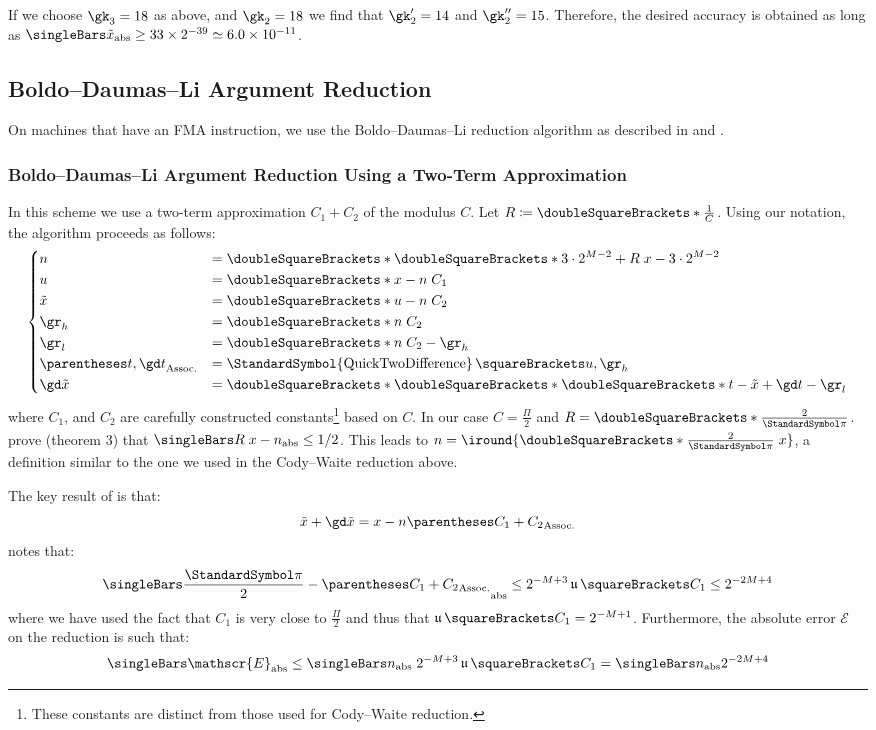 \documentclass[10pt, a4paper, twoside]{basestyle}
\DeclareMathOperator{\ULP}{\mathfrak u}
\DeclareMathOperator{\quicktwodifference}{\StandardSymbol{QuickTwoDifference}}
\newcommand{\round}[1]{\doubleSquareBrackets*{#1}}
\newcommand{\red}[1]{\tilde{#1}}
\begin{document}
If we choose $\gk_3 = 18$ as above, and $\gk_2 = 18$ we find that $\gk'_2 = 14$ and $\gk''_2 = 15$.  Therefore, the desired accuracy is obtained as long as $\abs{\red x} \geq 33 \times 2^{-39} \simeq 6.0 \times 10^{-11}$.

\subsection*{Boldo--Daumas--Li Argument Reduction}

On machines that have an FMA instruction, we use the Boldo--Daumas--Li reduction algorithm as described in \cite{BoldoDaumasLi2009} and \cite[204-206]{Muller2016}.  

\subsubsection*{Boldo--Daumas--Li Argument Reduction Using a Two-Term Approximation}

In this scheme we use a two-term approximation $C_1 + C_2$ of the modulus $C$.  Let $R \DefineAs \round{\frac{1}{C}}$.  Using our notation, the algorithm proceeds as follows:
\[
\begin{dcases}
n &= \round{\round{3 \cdot 2^{M - 2} + R \; x} - 3 \cdot 2^{M - 2}} \\
u &= \round{x - n \; C_1} \\
\red x &= \round{u - n \; C_2} \\
\gr_h &= \round{n \; C_2} \\
\gr_l &= \round{n \; C_2 - \gr_h} \\
\pa{t, \gd t} &= \quicktwodifference\of{u, \gr_h} \\
\gd \red x &= \round{\round{\round{t - \red x} + \gd t} - \gr_l}
\end{dcases}
\]
where $C_1$, and $C_2$ are carefully constructed constants\footnote{These constants are distinct from those used for Cody--Waite reduction.} based on $C$.  In our case $C = \frac{\Pi}{2}$ and $R = \round{\frac{2}{\Pi}}$. \cite[1141]{BoldoDaumasLi2009} prove (theorem 3) that $\abs{R \; x - n} \leq 1/2$.  This leads to $n = \iround{\round{\frac{2}{\Pi}} \; x}$, a definition similar to the one we used in the Cody--Waite reduction above.

The key result of \cite{BoldoDaumasLi2009} is that:
\[
\red x + \gd \red x = x - n \pa{C_1 + C_2}
\]
\cite[205]{Muller2016} notes that:
\begin{equation}
\abs{\frac{\Pi}{2} - \pa{C_1 + C_2}} \leq 2^{-M + 3} \ULP\of{C_1} \leq 2^{-2 M + 4}
\label{eqnmullermodulo}
\end{equation}
where we have used the fact that $C_1$ is very close to $\frac{\Pi}{2}$ and thus that $\ULP\of{C_1} = 2^{-M + 1}$.  Furthermore, the absolute error $\mathscr E$ on the reduction is such that:
\[
\abs{\mathscr{E}} \leq \abs{n} \; 2^{-M + 3} \ULP\of{C_1} = \abs{n} 2^{-2 M + 4}
\]
\end{document}
